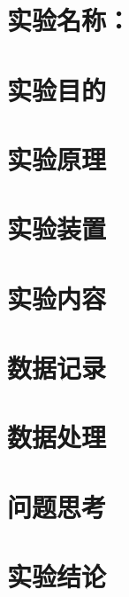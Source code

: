 \documentclass[12pt,a4paper]{article}
\begin{document}
	
	\section{实验名称：}
	
	\section{实验目的}
	

	\section{实验原理}

	
	\section{实验装置}
	

	\section{实验内容}

	
	\section{数据记录}


	\section{数据处理}


	\section{问题思考}

	
	\section{实验结论}
\end{document}
